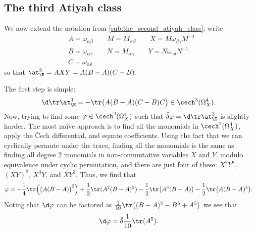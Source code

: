     


    \subsection{The third Atiyah class} %
    \label{sub:the_third_atiyah_class}

            We now extend the notation from \cref{sub:the_second_atiyah_class}: write
            \begin{align*}
                &A=\omega_{\alpha\beta} \qquad M=M_{\alpha\beta} \qquad X=M\omega_{\beta\gamma}M^{-1}\\
                &B=\omega_{\alpha\gamma} \qquad N=M_{\alpha\gamma} \qquad Y=N\omega_{\gamma\delta}N^{-1}\\
                &C=\omega_{\alpha\delta}
            \end{align*}
            so that $\at_\E^3 = AXY = A(B-A)(C-B)$.

            The first step is simple:
            \[
                \d\tr\at_\E^3 = -\tr\big(A(B-A)(C-B)C\big)\in\cech^3(\Omega^4_X).
            \]
            Now, trying to find some $\varphi\in\cech^2(\Omega^4_X)$ such that $\check\delta\varphi=\d\tr\at_\E^3$ is slightly harder.
            The most naïve approach is to find all the monomials in $\cech^2(\Omega^4_X)$, apply the Čech differential, and equate coefficients.
            Using the fact that we can cyclically permute under the trace, finding all the monomials is the same as finding all degree $2$ monomials in non-commutative variables $X$ and $Y$, modulo equivalence under cyclic permutation, and there are just four of these: $X^2Y^2$, $(XY)^2$, $X^3Y$, and $XY^3$.
            Thus, we find that
            \begin{equation}\label{equation:2-4-term-manual-construction}
                \varphi = - \frac14\tr\Big(\big(A(B-A)\big)^2\Big) + \frac12 \tr(A^2(B-A)^2) - \frac12\tr\big(A^3(B-A)\big) - \frac12\tr\big(A(B-A)^3\big).
            \end{equation}
            Noting that $\d\varphi$ can be factored as $\frac{1}{10}\tr\big((B-A)^5-B^5+A^5\big)$ we see that
            \begin{equation}\label{equation:1-5-term-manual-construction}
                \d\varphi = \check\delta\frac{1}{10}\tr(A^5).
            \end{equation}

